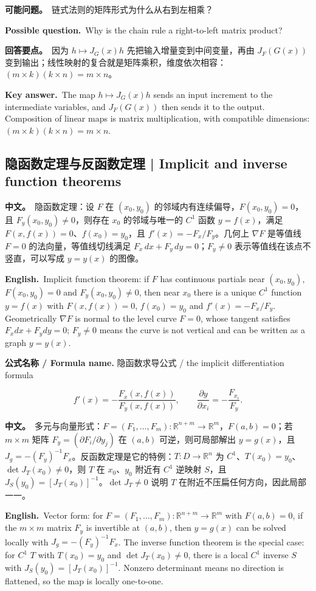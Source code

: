\documentclass[UTF8,11pt,a4paper]{ctexart}
\newcommand{\BOTH}[2]{\par\noindent\textbf{中文。}\ #1\par\noindent\textbf{English.}\ #2\par}
\newcommand{\FORMULA}[2]{\par\noindent\textbf{公式名称 / Formula name.} #1 / #2\par}
\newcommand{\ASK}[4]{\begin{samepage}\par\noindent\textbf{可能问题。}\ #1\par\noindent\textbf{Possible question.}\ #2\par\noindent\textbf{回答要点。}\ #3\par\noindent\textbf{Key answer.}\ #4\medskip\end{samepage}}
\begin{document}
\ASK{链式法则的矩阵形式为什么从右到左相乘？}{Why is the chain rule a right-to-left matrix product?}{因为 $h\mapsto J_G(x)h$ 先把输入增量变到中间变量，再由 $J_F(G(x))$ 变到输出；线性映射的复合就是矩阵乘积，维度依次相容：$(m\times k)(k\times n)=m\times n$。}{The map $h\mapsto J_G(x)h$ sends an input increment to the intermediate variables, and $J_F(G(x))$ then sends it to the output. Composition of linear maps is matrix multiplication, with compatible dimensions: $(m\times k)(k\times n)=m\times n$.}

\subsection{隐函数定理与反函数定理 | Implicit and inverse function theorems}
\BOTH{隐函数定理：设 $F$ 在 $(x_0,y_0)$ 的邻域内有连续偏导，$F(x_0,y_0)=0$，且 $F_y(x_0,y_0)\ne0$，则存在 $x_0$ 的邻域与唯一的 $C^1$ 函数 $y=f(x)$，满足 $F(x,f(x))=0$、$f(x_0)=y_0$，且 $f'(x)=-F_x/F_y$。几何上 $\nabla F$ 是等值线 $F=0$ 的法向量，等值线切线满足 $F_x\,dx+F_y\,dy=0$；$F_y\ne0$ 表示等值线在该点不竖直，可以写成 $y=y(x)$ 的图像。}{Implicit function theorem: if $F$ has continuous partials near $(x_0,y_0)$, $F(x_0,y_0)=0$ and $F_y(x_0,y_0)\ne0$, then near $x_0$ there is a unique $C^1$ function $y=f(x)$ with $F(x,f(x))=0$, $f(x_0)=y_0$ and $f'(x)=-F_x/F_y$. Geometrically $\nabla F$ is normal to the level curve $F=0$, whose tangent satisfies $F_xdx+F_ydy=0$; $F_y\ne0$ means the curve is not vertical and can be written as a graph $y=y(x)$.}
\FORMULA{隐函数求导公式}{the implicit differentiation formula}
\[
f'(x)=-\frac{F_x(x,f(x))}{F_y(x,f(x))},\qquad \frac{\partial y}{\partial x_i}=-\frac{F_{x_i}}{F_y}.
\]
\BOTH{多元与向量形式：$F=(F_1,\ldots,F_m):\mathbb R^{n+m}\to\mathbb R^m$，$F(a,b)=0$；若 $m\times m$ 矩阵 $F_y=(\partial F_i/\partial y_j)$ 在 $(a,b)$ 可逆，则可局部解出 $y=g(x)$，且 $J_g=-(F_y)^{-1}F_x$。反函数定理是它的特例：$T:D\to\mathbb R^n$ 为 $C^1$、$T(x_0)=y_0$、$\det J_T(x_0)\ne0$，则 $T$ 在 $x_0$、$y_0$ 附近有 $C^1$ 逆映射 $S$，且 $J_S(y_0)=[J_T(x_0)]^{-1}$。$\det J_T\ne0$ 说明 $T$ 在附近不压扁任何方向，因此局部一一。}{Vector form: for $F=(F_1,\ldots,F_m):\mathbb R^{n+m}\to\mathbb R^m$ with $F(a,b)=0$, if the $m\times m$ matrix $F_y$ is invertible at $(a,b)$, then $y=g(x)$ can be solved locally with $J_g=-(F_y)^{-1}F_x$. The inverse function theorem is the special case: for $C^1$ $T$ with $T(x_0)=y_0$ and $\det J_T(x_0)\ne0$, there is a local $C^1$ inverse $S$ with $J_S(y_0)=[J_T(x_0)]^{-1}$. Nonzero determinant means no direction is flattened, so the map is locally one-to-one.}
\end{document}
